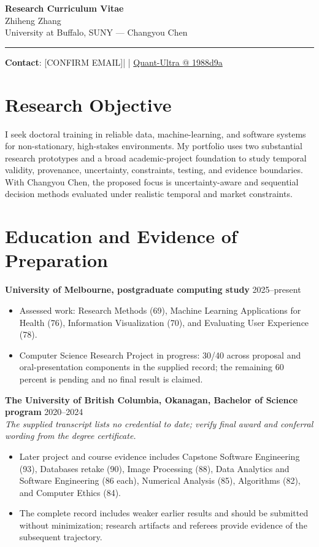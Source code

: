 \documentclass[11pt]{article}
\makeatletter
\newcommand{\ApplicantName}{Zhiheng Zhang}
\newcommand{\ApplicantEmail}{[CONFIRM EMAIL]}
\newcommand{\ApplicantPhone}{[CONFIRM PHONE]}
\newcommand{\ApplicantGitHub}{\href{https://github.com/zhiheng-zhang-Mera/Quant-Ultra/tree/1988d9a8530da91a8158de864d098ea869098923}{Quant-Ultra @ 1988d9a}}
\makeatother
\begin{document}
\begin{center}
{\LARGE\bfseries Research Curriculum Vitae}\\[0.25em]
{\large \ApplicantName}\\
University at Buffalo, SUNY --- Changyou Chen
\end{center}
\vspace{0.35em}\hrule\vspace{0.65em}

\textbf{Contact}: \ApplicantEmail\quad | \quad \ApplicantPhone\quad | \quad \ApplicantGitHub

\section*{Research Objective}
I seek doctoral training in reliable data, machine-learning, and software systems for non-stationary, high-stakes environments. My portfolio uses two substantial research prototypes and a broad academic-project foundation to study temporal validity, provenance, uncertainty, constraints, testing, and evidence boundaries. With Changyou Chen, the proposed focus is uncertainty-aware and sequential decision methods evaluated under realistic temporal and market constraints.

\section*{Education and Evidence of Preparation}
\textbf{University of Melbourne, postgraduate computing study} \hfill 2025--present
\begin{itemize}
\item Assessed work: Research Methods (69), Machine Learning Applications for Health (76), Information Visualization (70), and Evaluating User Experience (78).
\item Computer Science Research Project in progress: 30/40 across proposal and oral-presentation components in the supplied record; the remaining 60 percent is pending and no final result is claimed.
\end{itemize}

\textbf{The University of British Columbia, Okanagan, Bachelor of Science program} \hfill 2020--2024\\
\textit{The supplied transcript lists no credential to date; verify final award and conferral wording from the degree certificate.}
\begin{itemize}
\item Later project and course evidence includes Capstone Software Engineering (93), Databases retake (90), Image Processing (88), Data Analytics and Software Engineering (86 each), Numerical Analysis (85), Algorithms (82), and Computer Ethics (84).
\item The complete record includes weaker earlier results and should be submitted without minimization; research artifacts and referees provide evidence of the subsequent trajectory.
\end{itemize}
\end{document}
